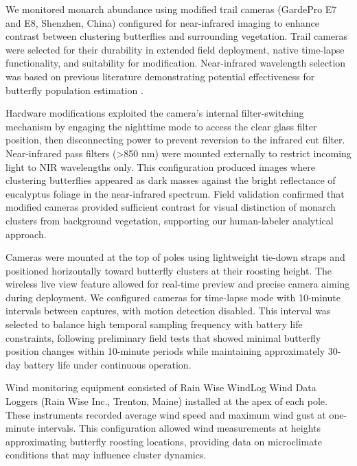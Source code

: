 We monitored monarch abundance using modified trail cameras (GardePro E7 and E8, Shenzhen, China) configured for near-infrared imaging to enhance contrast between clustering butterflies and surrounding vegetation. Trail cameras were selected for their durability in extended field deployment, native time-lapse functionality, and suitability for modification. Near-infrared wavelength selection was based on previous literature demonstrating potential effectiveness for butterfly population estimation \autocite{hristov_estimating_2019}. 

Hardware modifications exploited the camera's internal filter-switching mechanism by engaging the nighttime mode to access the clear glass filter position, then disconnecting power to prevent reversion to the infrared cut filter. Near-infrared pass filters (>850 nm) were mounted externally to restrict incoming light to NIR wavelengths only. This configuration produced images where clustering butterflies appeared as dark masses against the bright reflectance of eucalyptus foliage in the near-infrared spectrum. Field validation confirmed that modified cameras provided sufficient contrast for visual distinction of monarch clusters from background vegetation, supporting our human-labeler analytical approach.

Cameras were mounted at the top of poles using lightweight tie-down straps and positioned horizontally toward butterfly clusters at their roosting height. The wireless live view feature allowed for real-time preview and precise camera aiming during deployment. We configured cameras for time-lapse mode with 10-minute intervals between captures, with motion detection disabled. This interval was selected to balance high temporal sampling frequency with battery life constraints, following preliminary field tests that showed minimal butterfly position changes within 10-minute periods while maintaining approximately 30-day battery life under continuous operation.

Wind monitoring equipment consisted of Rain Wise WindLog Wind Data Loggers (Rain Wise Inc., Trenton, Maine) installed at the apex of each pole. These instruments recorded average wind speed and maximum wind gust at one-minute intervals. This configuration allowed wind measurements at heights approximating butterfly roosting locations, providing data on microclimate conditions that may influence cluster dynamics.

